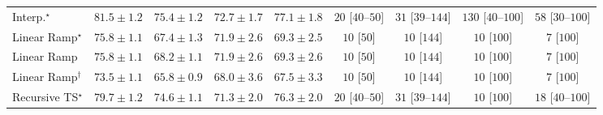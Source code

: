 \begin{tabular}{l|cccc|cccc|}
Interp.$^\star$ & {\cellcolor[HTML]{6E2706}} \color[HTML]{F1F1F1} $81.5\pm 1.2$ & {\cellcolor[HTML]{D55607}} \color[HTML]{F1F1F1} $75.4\pm 1.2$ & {\cellcolor[HTML]{F07919}} \color[HTML]{F1F1F1} $72.7\pm 1.7$ & {\cellcolor[HTML]{BC4503}} \color[HTML]{F1F1F1} $77.1\pm 1.8$ & {\cellcolor[HTML]{FFF4F0}} \color[HTML]{000000} $20$ [$40$--$50$] & {\cellcolor[HTML]{FFF2EE}} \color[HTML]{000000} $31$ [$39$--$144$] & {\cellcolor[HTML]{FDDBD7}} \color[HTML]{000000} $130$ [$40$--$100$] & {\cellcolor[HTML]{FEECE9}} \color[HTML]{000000} $58$ [$30$--$100$] \\
Linear Ramp$^\star$ & {\cellcolor[HTML]{D15205}} \color[HTML]{F1F1F1} $75.8\pm 1.1$ & {\cellcolor[HTML]{FEC754}} \color[HTML]{000000} $67.4\pm 1.3$ & {\cellcolor[HTML]{F5851F}} \color[HTML]{F1F1F1} $71.9\pm 2.6$ & {\cellcolor[HTML]{FEAB39}} \color[HTML]{000000} $69.3\pm 2.5$ & {\cellcolor[HTML]{FFF7F3}} \color[HTML]{000000} $10$ [$50$] & {\cellcolor[HTML]{FFF7F3}} \color[HTML]{000000} $10$ [$144$] & {\cellcolor[HTML]{FFF7F3}} \color[HTML]{000000} $10$ [$100$] & {\cellcolor[HTML]{FFF7F3}} \color[HTML]{000000} $7$ [$100$] \\
Linear Ramp & {\cellcolor[HTML]{D15205}} \color[HTML]{F1F1F1} $75.8\pm 1.1$ & {\cellcolor[HTML]{FEBB47}} \color[HTML]{000000} $68.2\pm 1.1$ & {\cellcolor[HTML]{F5851F}} \color[HTML]{F1F1F1} $71.9\pm 2.6$ & {\cellcolor[HTML]{FEAB39}} \color[HTML]{000000} $69.3\pm 2.6$ & {\cellcolor[HTML]{FFF7F3}} \color[HTML]{000000} $10$ [$50$] & {\cellcolor[HTML]{FFF7F3}} \color[HTML]{000000} $10$ [$144$] & {\cellcolor[HTML]{FFF7F3}} \color[HTML]{000000} $10$ [$100$] & {\cellcolor[HTML]{FFF7F3}} \color[HTML]{000000} $7$ [$100$] \\
Linear Ramp$^\dagger$ & {\cellcolor[HTML]{EA6E13}} \color[HTML]{F1F1F1} $73.5\pm 1.1$ & {\cellcolor[HTML]{FED87A}} \color[HTML]{000000} $65.8\pm 0.9$ & {\cellcolor[HTML]{FEBE4A}} \color[HTML]{000000} $68.0\pm 3.6$ & {\cellcolor[HTML]{FEC652}} \color[HTML]{000000} $67.5\pm 3.3$ & {\cellcolor[HTML]{FFF7F3}} \color[HTML]{000000} $10$ [$50$] & {\cellcolor[HTML]{FFF7F3}} \color[HTML]{000000} $10$ [$144$] & {\cellcolor[HTML]{FFF7F3}} \color[HTML]{000000} $10$ [$100$] & {\cellcolor[HTML]{FFF7F3}} \color[HTML]{000000} $7$ [$100$] \\
Recursive TS$^\star$ & {\cellcolor[HTML]{8E3104}} \color[HTML]{F1F1F1} $79.7\pm 1.2$ & {\cellcolor[HTML]{DE610C}} \color[HTML]{F1F1F1} $74.6\pm 1.1$ & {\cellcolor[HTML]{F98E23}} \color[HTML]{F1F1F1} $71.3\pm 2.0$ & {\cellcolor[HTML]{CB4B02}} \color[HTML]{F1F1F1} $76.3\pm 2.0$ & {\cellcolor[HTML]{FFF4F0}} \color[HTML]{000000} $20$ [$40$--$50$] & {\cellcolor[HTML]{FFF2EE}} \color[HTML]{000000} $31$ [$39$--$144$] & {\cellcolor[HTML]{FFF7F3}} \color[HTML]{000000} $10$ [$100$] & {\cellcolor[HTML]{FFF5F1}} \color[HTML]{000000} $18$ [$40$--$100$] \\

\end{tabular}
